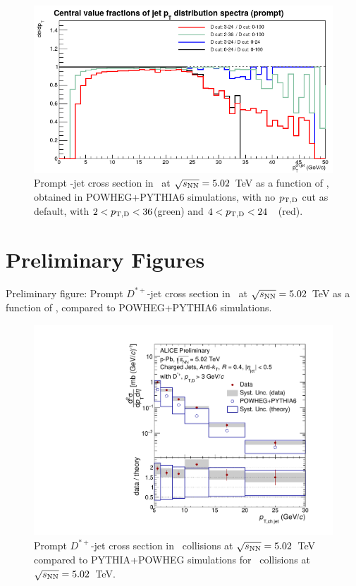 \begin{figure}[bth]
\begin{center}
\includegraphics[width=.55\textwidth]{pPbplots/simulations/JetSpectra_DptCut}
\caption{Prompt \Dstar-jet cross section in \pPb\ at $\sqrt{s_{\rm NN}}=5.02$~TeV as a function of \ptchjet, obtained in POWHEG+PYTHIA6 simulations, with no $p_{\mathrm{T,D}}$ cut as default, with $2 < p_{\mathrm{T,D}} < 36$(green) and $4 < p_{\mathrm{T,D}} < 24$~\GeVc\ (red).} 
\label{fig:PromptDSim_JetSpectraComparison_PtDCut}
\end{center}
\end{figure}


\section{Preliminary Figures}

Preliminary figure: Prompt $D^{*+}$-jet cross section in \pPb\ at $\sqrt{s_{\rm NN}}=5.02$~TeV as a function of \ptchjet, compared to POWHEG+PYTHIA6 simulations.


\begin{figure}[bth]
\centering
\includegraphics[width=.53\textwidth]{pPbplots/jetSpectra/DstarJet_pPbxsection}
\caption{Prompt $D^{*+}$-jet cross section in \pPb\ collisions at $\sqrt{s_{\rm NN}}=5.02$~TeV compared to PYTHIA+POWHEG simulations for \pPb\ collisions at $\sqrt{s_{\rm NN}}=5.02$~TeV.}
\label{fig:pPbJetPt_final_wpp}
\end{figure}



{}


